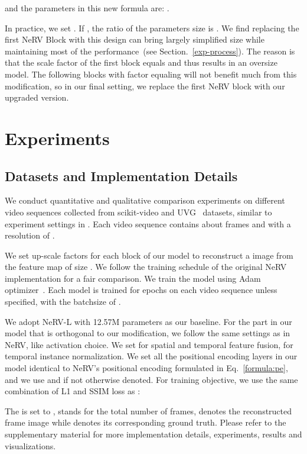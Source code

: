 \documentclass[runningheads]{llncs}
\begin{document}
and the parameters in this new formula are: .

In practice, we set . If , the ratio of the parameters size is . We find replacing the first NeRV Block with this design can bring largely simplified size while maintaining most of the performance~(see Section.~\ref{exp-process}). The reason is that the scale factor of the first block equals  and thus results in an oversize model. The following blocks with factor equaling  will not benefit much from this modification, so in our final setting, we replace the first NeRV block with our upgraded version. 

 \section{Experiments}
\label{experiments}

\subsection{Datasets and Implementation Details}
\label{datasets and implementation}

We conduct quantitative and qualitative comparison experiments on  different video sequences collected from scikit-video and UVG~\cite{mercat2020uvg} datasets, similar to experiment settings in \cite{chen2021nerv}. Each video sequence contains about  frames and with a resolution of .

We set up-scale factors  for each block of our model to reconstruct a  image from the feature map of size . We follow the training schedule of the original NeRV implementation for a fair comparison. We train the model using Adam optimizer~\cite{kingma2014adam}. Each model is trained for  epochs on each video sequence unless specified, with the batchsize of . 

We adopt NeRV-L with 12.57M parameters as our baseline. For the part in our model that is orthogonal to our modification, we follow the same settings as in NeRV, like activation choice. We set  for spatial and temporal feature fusion,  for temporal instance normalization. We set all the positional encoding layers in our model identical to NeRV's positional encoding formulated in Eq.~\ref{formula:pe}, and we use  and  if not otherwise denoted. For training objective, we use the same combination of L1 and SSIM loss as \cite{chen2021nerv}:



The  is set to ,  stands for the total number of frames,  denotes the reconstructed frame image while  denotes its corresponding ground truth. Please refer to the supplementary material for more implementation details, experiments, results and visualizations.
\end{document}
